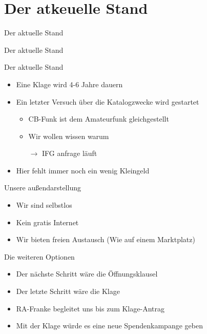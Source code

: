 \section*{Der atkeuelle Stand}
\begin{frame}{Der aktuelle Stand}
    \begin{center}
        Der aktuelle Stand
    \end{center}
\end{frame}

\begin{frame}{Der aktuelle Stand}
    \begin{itemize}
        \item Eine Klage wird 4-6 Jahre dauern
        \item Ein letzter Versuch über die Katalogzwecke wird gestartet
        \begin{itemize}
            \item CB-Funk ist dem Amateurfunk gleichgestellt
            \item Wir wollen wissen warum
            \item[$\rightarrow$] IFG anfrage läuft
        \end{itemize}
        \item Hier fehlt immer noch ein wenig Kleingeld
    \end{itemize}
\end{frame}

\begin{frame}{Unsere außendarstellung}
    \begin{itemize}
        \item Wir sind selbstlos
        \item Kein gratis Internet
        \item Wir bieten freien Austausch (Wie auf einem Marktplatz)
    \end{itemize}
\end{frame}

\begin{frame}{Die weiteren Optionen}
    \begin{itemize}
        \item Der nächste Schritt wäre die Öffnungsklausel
        \item Der letzte Schritt wäre die Klage
        \item RA-Franke begleitet uns bis zum Klage-Antrag
        \item Mit der Klage würde es eine neue Spendenkampange geben
    \end{itemize}
\end{frame}
